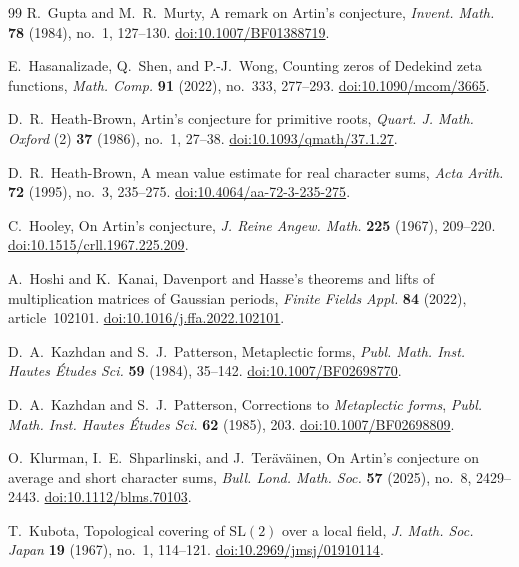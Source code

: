 \begin{thebibliography}{99}
R.~Gupta and M.~R.~Murty,
A remark on Artin's conjecture,
\emph{Invent. Math.} \textbf{78} (1984), no.~1, 127--130.
\href{https://doi.org/10.1007/BF01388719}{doi:10.1007/BF01388719}.

E.~Hasanalizade, Q.~Shen, and P.-J.~Wong,
Counting zeros of Dedekind zeta functions,
\emph{Math. Comp.} \textbf{91} (2022), no.~333, 277--293.
\href{https://doi.org/10.1090/mcom/3665}{doi:10.1090/mcom/3665}.

D.~R.~Heath-Brown,
Artin's conjecture for primitive roots,
\emph{Quart. J. Math. Oxford} (2) \textbf{37} (1986),
no.~1, 27--38.
\href{https://doi.org/10.1093/qmath/37.1.27}{doi:10.1093/qmath/37.1.27}.

D.~R.~Heath-Brown,
A mean value estimate for real character sums,
\emph{Acta Arith.} \textbf{72} (1995), no.~3, 235--275.
\href{https://doi.org/10.4064/aa-72-3-235-275}{doi:10.4064/aa-72-3-235-275}.

C.~Hooley,
On Artin's conjecture,
\emph{J. Reine Angew. Math.} \textbf{225} (1967), 209--220.
\href{https://doi.org/10.1515/crll.1967.225.209}{doi:10.1515/crll.1967.225.209}.

A.~Hoshi and K.~Kanai,
Davenport and Hasse's theorems and lifts of multiplication matrices of
Gaussian periods,
\emph{Finite Fields Appl.} \textbf{84} (2022), article~102101.
\href{https://doi.org/10.1016/j.ffa.2022.102101}{doi:10.1016/j.ffa.2022.102101}.

D.~A.~Kazhdan and S.~J.~Patterson,
Metaplectic forms,
\emph{Publ. Math. Inst. Hautes \'Etudes Sci.} \textbf{59} (1984), 35--142.
\href{https://doi.org/10.1007/BF02698770}{doi:10.1007/BF02698770}.

D.~A.~Kazhdan and S.~J.~Patterson,
Corrections to \emph{Metaplectic forms},
\emph{Publ. Math. Inst. Hautes \'Etudes Sci.} \textbf{62} (1985), 203.
\href{https://doi.org/10.1007/BF02698809}{doi:10.1007/BF02698809}.

O.~Klurman, I.~E.~Shparlinski, and J.~Ter\"av\"ainen,
On Artin's conjecture on average and short character sums,
\emph{Bull. Lond. Math. Soc.} \textbf{57} (2025), no.~8, 2429--2443.
\href{https://doi.org/10.1112/blms.70103}{doi:10.1112/blms.70103}.

T.~Kubota,
Topological covering of \(\mathrm{SL}(2)\) over a local field,
\emph{J. Math. Soc. Japan} \textbf{19} (1967), no.~1, 114--121.
\href{https://doi.org/10.2969/jmsj/01910114}{doi:10.2969/jmsj/01910114}.


\end{thebibliography}
